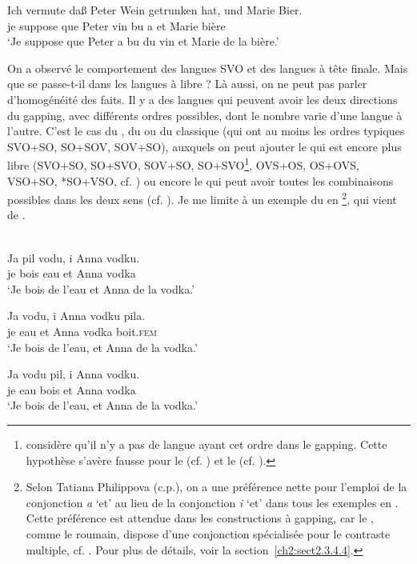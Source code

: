 \ex 
\gll Ich vermute daß Peter Wein getrunken hat, und Marie Bier.\\
je suppose que Peter vin bu a et Marie bière\\
\glt ‘Je suppose que Peter a bu du vin et Marie de la bière.’ 
\z
\z

On a observé le comportement des langues SVO et des langues à tête finale. Mais que se passe-t-il dans les langues à  libre ? Là aussi, on ne peut pas parler d’homogénéité des faits. Il y a des langues qui peuvent avoir les deux directions du gapping, avec différents ordres possibles, dont le nombre varie d’une langue à l’autre. C’est le cas du , du  ou du  classique (qui ont au moins les ordres typiques SVO+SO, SO+SOV, SOV+SO), auxquels on peut ajouter le  qui est encore plus libre (SVO+SO, SO+SVO, SOV+SO, SO+SVO\footnote{
 \citet{Ross1970} considère qu’il n’y a pas de langue ayant cet ordre dans le gapping. Cette hypothèse s’avère fausse pour le  (cf. \citealt{Pulte1971,Pulte1973}) et le  (cf. \citealt{Rosenbaum1977}).}, OVS+OS, OS+OVS, VSO+SO, *SO+VSO, cf. \citealt{Rosenbaum1977}) ou encore le  qui peut avoir toutes les combinaisons possibles dans les deux sens (cf. \citealt{Furbee1974}). Je me limite à un exemple du  en \footnote{
 Selon Tatiana Philippova (c.p.), on a une préférence nette pour l’emploi de la conjonction \textit{a} ‘et’ au lieu de la conjonction \textit{i} ‘et’ dans tous les exemples en . Cette préférence est attendue dans les constructions à gapping, car le , comme le roumain, dispose d’une conjonction spécialisée pour le contraste multiple, cf. \citet{BilbiieEtAl2011}. Pour plus de détails, voir la section~\ref{ch2:sect2.3.4.4}.}, qui vient de \citet{Ross1970}.

\ea \label{ch2:ex12}
\\
\ea 
\gll Ja pil vodu, i Anna vodku.\\
je bois eau et Anna vodka\\
\glt ‘Je bois de l’eau et Anna de la vodka.’

\ex 
\gll Ja vodu, i Anna vodku pila.\\
je eau et Anna vodka boit.\textsc{fem}\\
\glt ‘Je bois de l’eau, et Anna de la vodka.’

\ex 
\gll Ja vodu pil, i Anna vodku.\\
je eau bois et Anna vodka\\
\glt ‘Je bois de l’eau, et Anna de la vodka.’  
\z
\z

